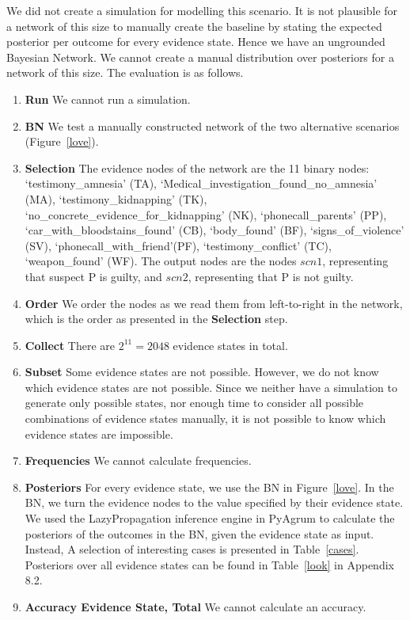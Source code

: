 \documentclass[12pt]{article}
\begin{document}
We did not create a simulation for modelling this scenario. It is not plausible for a network of this size to manually create the baseline by stating the expected posterior per outcome for every evidence state. Hence we have an ungrounded Bayesian Network. We cannot create a manual distribution over posteriors for a network of this size. The evaluation is as follows.

\begin{enumerate}
\item \textbf{Run} We cannot run a simulation.
\item \textbf{BN} We test a manually constructed network of the two alternative scenarios (Figure~\ref{love}).
\item \textbf{Selection} The evidence nodes of the network are the 11 binary nodes: `testimony\_amnesia' (TA), `Medical\_investigation\_found\_no\_amnesia' (MA), `testimony\_kidnapping' (TK), `no\_concrete\_evidence\_for\_kidnapping' (NK),
 `phonecall\_parents' (PP),  `car\_with\_bloodstains\_found' (CB), `body\_found' (BF), `signs\_of\_violence' (SV), `phonecall\_with\_friend'(PF), `testimony\_conflict' (TC), `weapon\_found' (WF). The output nodes are the nodes $scn1$, representing that suspect P is guilty, and $scn2$, representing that P is not guilty.
\item \textbf{Order} We order the nodes as we read them from left-to-right in the network, which is the order as presented in the \textbf{Selection} step.
\item \textbf{Collect} There are $2^{11} = 2048$ evidence states in total.
\item \textbf{Subset} Some evidence states are not possible. However, we do not know which evidence states are not possible. Since we neither have a simulation to generate only possible states, nor enough time to consider all possible combinations of evidence states manually, it is not possible to know which evidence states are impossible.
\item \textbf{Frequencies} We cannot calculate frequencies.
\item \textbf{Posteriors} For every evidence state, we use the BN in Figure~\ref{love}. In the BN, we turn the evidence nodes to the value specified by their evidence state. We used the LazyPropagation inference engine in PyAgrum to calculate the posteriors of the outcomes in the BN, given the evidence state as input. Instead, A selection of interesting cases is presented in Table~\ref{cases}. Posteriors over all evidence states can be found in Table~\ref{look} in Appendix 8.2.
\item \textbf{Accuracy Evidence State, Total} We cannot calculate an accuracy.
\end{enumerate}
\end{document}
